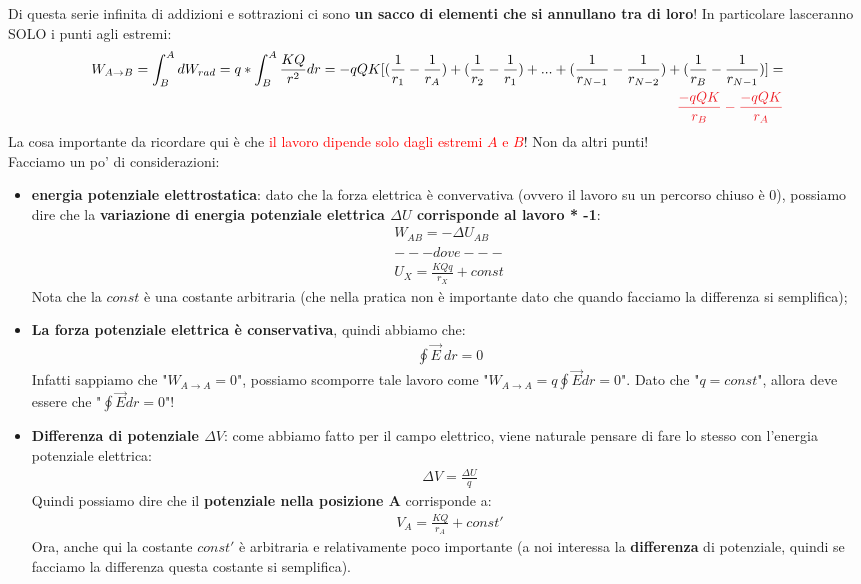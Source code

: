             Di questa serie infinita di addizioni e sottrazioni ci sono \textbf{un sacco di elementi che si annullano tra di loro}! In particolare lasceranno SOLO i punti agli estremi:
            \begin{align*}
                W_{A\rightarrow B} = \int_B^AdW_{rad} =q*\int^A_B\frac{KQ}{r^2}dr = -qQK[(\frac{1}{r_1}-\frac{1}{r_A})+(\frac{1}{r_2}-\frac{1}{r_1})+...+(\frac{1}{r_{N-1}}-\frac{1}{r_{N-2}})+(\frac{1}{r_{B}}-\frac{1}{r_{N-1}})]=\\
                \textcolor{Red}{\frac{-qQK}{r_B}-\frac{-qQK}{r_A}}
            \end{align*}
            La cosa importante da ricordare qui è che \textcolor{Red}{il lavoro dipende solo dagli estremi $A$ e $B$}! Non da altri punti!\\
            Facciamo un po' di considerazioni:
            \begin{itemize}
                \item \textbf{energia potenziale elettrostatica}: dato che la forza elettrica è convervativa (ovvero il lavoro su un percorso chiuso è 0), possiamo dire che la \textbf{variazione di energia potenziale  elettrica $\Delta U$ corrisponde al lavoro * -1}:
                \begin{align*}
                    W_{AB} = -\Delta U_{AB}\\
                    ---dove---\\
                    U_X=\frac{KQq}{r_X}+const
                \end{align*}
                Nota che la $const$ è una costante arbitraria (che nella pratica non è importante dato che quando facciamo la differenza si semplifica);
                \item \textbf{La forza potenziale elettrica è conservativa}, quindi abbiamo che:
                \begin{align*}
                    \oint\vec{E}\ dr = 0
                \end{align*}
                Infatti sappiamo che "$W_{A\rightarrow A} = 0$", possiamo scomporre tale lavoro come "$W_{A\rightarrow A} = q\oint \vec{E}dr = 0$". Dato che "$q=const$", allora deve essere che "$\oint \vec{E}dr = 0$"!
                \item\textbf{Differenza di potenziale $\Delta V$}: come abbiamo fatto per il campo elettrico, viene naturale pensare di fare lo stesso con l'energia potenziale elettrica:
                \begin{align*}
                    \Delta V = \frac{\Delta U}{q}
                \end{align*}
                Quindi possiamo dire che il \textbf{potenziale nella posizione A} corrisponde a:
                \begin{align*}
                    V_A=\frac{KQ}{r_A}+const'
                \end{align*}
                Ora, anche qui la costante $const'$ è arbitraria e relativamente poco importante (a noi interessa la \textbf{differenza} di potenziale, quindi se facciamo la differenza questa costante si semplifica).
            \end{itemize}

